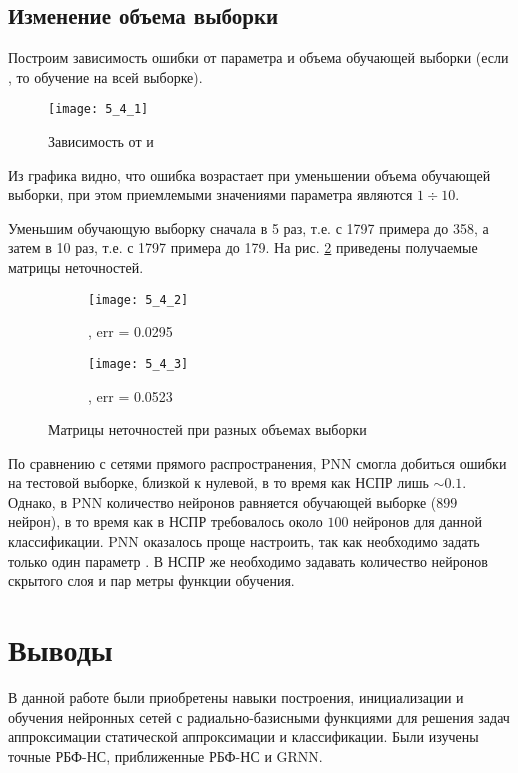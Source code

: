 \newpage

\subsection{Изменение объема выборки}


Построим зависимость ошибки  от параметра  и объема обучающей выборки  (если , то обучение на всей выборке). 
\begin{figure}[H]
\begin{center}
	\texttt{[image: 5\_4\_1]}
	\caption{Зависимость  от  и }
	\label{fig:5_4_1}
\end{center}
\end{figure}
Из графика видно, что ошибка возрастает при уменьшении объема обучающей выборки, при этом приемлемыми значениями параметра  являются $1 \div 10$.

Уменьшим обучающую выборку сначала в 5 раз, т.е. с 1797 примера до 358, а затем в 10 раз, т.е. с 1797 примера до 179. На рис. \ref{fig:5_4_2} приведены получаемые матрицы неточностей.
\begin{figure}[H]
\begin{center}
	\begin{subfigure}{0.49\textwidth}
		\texttt{[image: 5\_4\_2]}
		\caption{, err = 0.0295}
	\end{subfigure}
	\begin{subfigure}{0.49\textwidth}
		\texttt{[image: 5\_4\_3]}
		\caption{, err = 0.0523}
	\end{subfigure}
	\caption{Матрицы неточностей при разных объемах выборки}
	\label{fig:5_4_2}
\end{center}
\end{figure}

По сравнению с сетями прямого распространения, PNN смогла добиться ошибки на тестовой выборке, близкой к нулевой, в то время как НСПР лишь $\sim 0.1$. Однако, в PNN количество нейронов равняется обучающей выборке ($899$ нейрон), в то время как в НСПР требовалось около $100$ нейронов для данной классификации. PNN оказалось проще настроить, так как необходимо задать только один параметр . В НСПР же необходимо задавать количество нейронов скрытого слоя и пар метры функции обучения.

\section{Выводы}

В данной работе были приобретены навыки построения, инициализации и обучения нейронных сетей с радиально-базисными функциями для решения задач аппроксимации статической аппроксимации и классификации. Были изучены точные РБФ-НС, приближенные РБФ-НС и GRNN.

